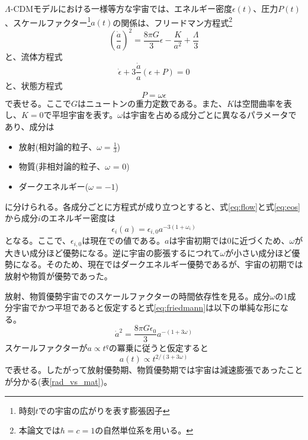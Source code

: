 $\Lambda$-CDMモデルにおける一様等方な宇宙では、エネルギー密度$\epsilon(t)$、圧力$P(t)$、スケールファクター\footnote{時刻$t$での宇宙の広がりを表す膨張因子}$a(t)$の関係は、フリードマン方程式\footnote{本論文では$\hbar=c=1$の自然単位系を用いる。}
\begin{equation}
  \left(\frac{\dot{a}}{a}\right)^2 = \frac{8\pi G}{3}\epsilon -\frac{K}{a^2} + \frac{\Lambda}{3} \label{eq:friedmann}
\end{equation}
と、流体方程式
\begin{equation}
  \dot{\epsilon} + 3\frac{\dot{a}}{a}(\epsilon + P) = 0 \label{eq:flow}
\end{equation}
と、状態方程式
\begin{equation}
  P = \omega\epsilon \label{eq:eos}
\end{equation}
で表せる\cite{nyuumonn}。ここで$G$はニュートンの重力定数である。また、$K$は空間曲率を表し、$K=0$で平坦宇宙を表す。$\omega$は宇宙を占める成分ごとに異なるパラメータであり、成分は
\begin{itemize}
  \item 放射(相対論的粒子、$\omega=\frac{1}{3}$)
  \item 物質(非相対論的粒子、$\omega$ = 0)
  \item ダークエネルギー($\omega = -1$)
\end{itemize}
に分けられる。各成分ごとに方程式が成り立つとすると、式\eqref{eq:flow}と式\eqref{eq:eos}から成分$i$のエネルギー密度は
\begin{equation}
  \epsilon_{i}(a) = \epsilon_{i,0}a^{-3(1+\omega_{i})} \label{eq:energy_density}
\end{equation}
となる。ここで、$\epsilon_{i,0}$は現在での値である。$a$は宇宙初期では0に近づくため、$\omega$が大きい成分ほど優勢になる。逆に宇宙の膨張するにつれて$\omega$が小さい成分ほど優勢になる。そのため、現在ではダークエネルギー優勢であるが、宇宙の初期では放射や物質が優勢であった。

放射、物質優勢宇宙でのスケールファクターの時間依存性を見る。成分$\omega$の1成分宇宙でかつ平坦であると仮定すると式\eqref{eq:friedmann}は以下の単純な形になる。
\begin{equation}
  \dot{a}^{2} = \frac{8\pi G\epsilon_{0}}{3}a^{-(1+3\omega)}
\end{equation}
スケールファクターが$a\propto t^{q}$の冪乗に従うと仮定すると
\begin{equation}
  a(t) \propto t^{2/(3+3\omega)}
\end{equation}
で表せる。したがって放射優勢期、物質優勢期では宇宙は減速膨張であったことが分かる(表\ref{rad_vs_mat})。


